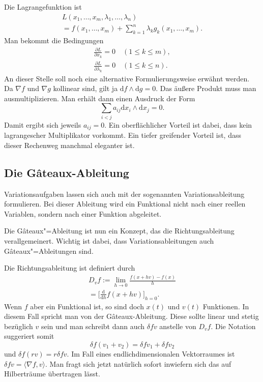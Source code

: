 \documentclass[a4paper,10pt,fleqn,twocolumn,twoside]{article}
\begin{document}
Die Lagrangefunktion ist
\begin{gather*}
L(x_1,\ldots,x_m,\lambda_1,\ldots,\lambda_n)\\
= f(x_1,\ldots,x_m)+\sum_{k=1}^n \lambda_k g_k(x_1,\ldots,x_m).
\end{gather*}
Man bekommt die Bedingungen
\begin{gather*}
\frac{\partial L}{\partial x_k}=0 \quad (1\le k\le m),\\
\frac{\partial L}{\partial \lambda_k}=0 \quad (1\le k\le n).
\end{gather*}
An dieser Stelle soll noch eine alternative Formulierungsweise
erwähnt werden. Da $\nabla f$ und $\nabla g$ kollinear sind,
gilt ja $\mathrm df\wedge\mathrm dg=0$. Das äußere Produkt muss
man ausmultiplizieren. Man erhält dann einen Ausdruck der Form
\[\sum_{i<j} a_{ij}\mathrm dx_i\wedge\mathrm dx_j=0.\]
Damit ergibt sich jeweils $a_{ij}=0$. Ein oberflächlicher Vorteil
ist dabei, dass kein lagrangescher Multiplikator vorkommt.
Ein tiefer greifender Vorteil ist, dass dieser Rechenweg manchmal
eleganter ist.

\subsection{Die Gâteaux-Ableitung}

Variationsaufgaben lassen sich auch mit der sogenannten
Variationsableitung formulieren. Bei dieser Ableitung wird ein
Funktional nicht nach einer reellen Variablen, sondern nach einer
Funktion abgeleitet.

Die Gâteaux"=Ableitung ist nun ein Konzept, das die Richtungsableitung
verallgemeinert. Wichtig ist dabei, dass Variationsableitungen auch
Gâteaux"=Ableitungen sind.

Die Richtungsableitung ist definiert durch
\begin{gather*}
D_v f := \lim_{h\rightarrow 0} \frac{f(x+hv)-f(x)}{h}\\
= \Big[\frac{\mathrm d}{\mathrm dh}f(x+hv)\Big]_{h=0}.
\end{gather*}
Wenn $f$ aber ein Funktional ist, so sind doch $x(t)$ und $v(t)$
Funktionen. In diesem Fall spricht man von der Gâteaux-Ableitung.
Diese sollte linear und stetig bezüglich $v$ sein und man schreibt dann
auch $\delta f v$ anstelle von $D_v f$. Die Notation suggeriert
somit
\[\delta f(v_1+v_2) = \delta fv_1 + \delta fv_2\]
und $\delta f(rv) = r\delta fv$. Im Fall eines endlichdimensionalen
Vektorraumes ist $\delta f v = \langle \nabla f,v\rangle$. Man
fragt sich jetzt natürlich sofort inwiefern sich das auf
Hilberträume übertragen lässt.
\end{document}
